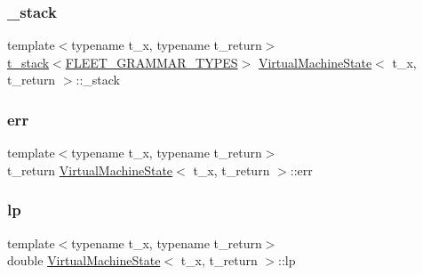 \subsubsection{\texorpdfstring{\+\_\+stack}{\_stack}}
{\footnotesize\ttfamily template$<$typename t\+\_\+x, typename t\+\_\+return$>$ \\
\hyperlink{struct_virtual_machine_state_1_1t__stack}{t\+\_\+stack}$<$\hyperlink{_rational_rules_2_main_8cpp_a89fb8e7826ca09e23da0ce4b39ee03c0}{F\+L\+E\+E\+T\+\_\+\+G\+R\+A\+M\+M\+A\+R\+\_\+\+T\+Y\+P\+ES}$>$ \hyperlink{class_virtual_machine_state}{Virtual\+Machine\+State}$<$ t\+\_\+x, t\+\_\+return $>$\+::\+\_\+stack}

\mbox{\label{class_virtual_machine_state_aca5b21a6e1babe0d57086ae49ebf6c7d}} 
\subsubsection{\texorpdfstring{err}{err}}
{\footnotesize\ttfamily template$<$typename t\+\_\+x, typename t\+\_\+return$>$ \\
t\+\_\+return \hyperlink{class_virtual_machine_state}{Virtual\+Machine\+State}$<$ t\+\_\+x, t\+\_\+return $>$\+::err}

\mbox{\label{class_virtual_machine_state_adce04f52049f686272022e4f1b8c0257}} 
\subsubsection{\texorpdfstring{lp}{lp}}
{\footnotesize\ttfamily template$<$typename t\+\_\+x, typename t\+\_\+return$>$ \\
double \hyperlink{class_virtual_machine_state}{Virtual\+Machine\+State}$<$ t\+\_\+x, t\+\_\+return $>$\+::lp}

\mbox{\label{class_virtual_machine_state_a61a1809d19f878d8de34198d0b7671b2}} 
